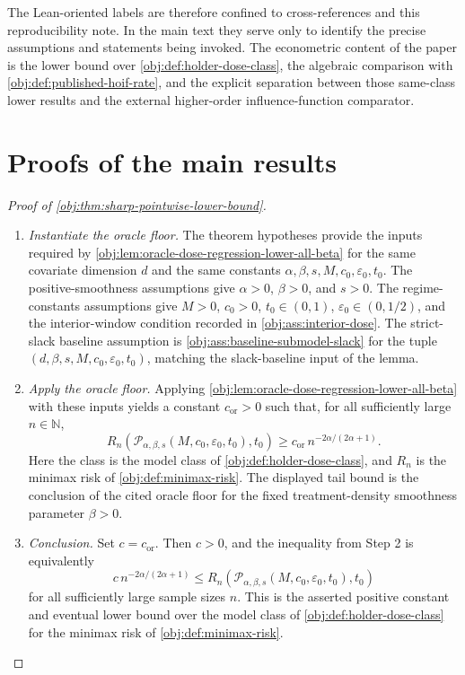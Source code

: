 \documentclass[11pt]{article}
\begin{document}
The Lean-oriented labels are therefore confined to cross-references and this reproducibility note. In the main text they serve only to identify the precise assumptions and statements being invoked. The econometric content of the paper is the lower bound over \cref{obj:def:holder-dose-class}, the algebraic comparison with \cref{obj:def:published-hoif-rate}, and the explicit separation between those same-class lower results and the external higher-order influence-function comparator.


\section{Proofs of the main results}\label{sec:deferred-proofs}

\begin{proof}[Proof of \cref{obj:thm:sharp-pointwise-lower-bound}]
\begin{enumerate}
\item \emph{Instantiate the oracle floor.} The theorem hypotheses provide the inputs required by \cref{obj:lem:oracle-dose-regression-lower-all-beta} for the same covariate dimension \(d\) and the same constants \(\alpha,\beta,s,M,c_0,\varepsilon_0,t_0\). The positive-smoothness assumptions give \(\alpha>0\), \(\beta>0\), and \(s>0\). The regime-constants assumptions give \(M>0\), \(c_0>0\), \(t_0\in(0,1)\), \(\varepsilon_0\in(0,1/2)\), and the interior-window condition recorded in \cref{obj:ass:interior-dose}. The strict-slack baseline assumption is \cref{obj:ass:baseline-submodel-slack} for the tuple \((d,\beta,s,M,c_0,\varepsilon_0,t_0)\), matching the slack-baseline input of the lemma.

\item \emph{Apply the oracle floor.} Applying \cref{obj:lem:oracle-dose-regression-lower-all-beta} with these inputs yields a constant \(c_{\mathrm{or}}>0\) such that, for all sufficiently large \(n\in\mathbb N\),
\[
R_n\!\left(
    \mathcal P_{\alpha,\beta,s}(M,c_0,\varepsilon_0,t_0),
    t_0
  \right)
\ge
c_{\mathrm{or}}\,n^{-2\alpha/(2\alpha+1)} .
\]
Here the class is the model class of \cref{obj:def:holder-dose-class}, and \(R_n\) is the minimax risk of \cref{obj:def:minimax-risk}. The displayed tail bound is the conclusion of the cited oracle floor for the fixed treatment-density smoothness parameter \(\beta>0\).

\item \emph{Conclusion.} Set \(c=c_{\mathrm{or}}\). Then \(c>0\), and the inequality from Step 2 is equivalently
\[
  c\, n^{-2\alpha/(2\alpha+1)}
  \le
  R_n\!\left(
    \mathcal P_{\alpha,\beta,s}(M,c_0,\varepsilon_0,t_0),
    t_0
  \right)
\]
for all sufficiently large sample sizes \(n\). This is the asserted positive constant and eventual lower bound over the model class of \cref{obj:def:holder-dose-class} for the minimax risk of \cref{obj:def:minimax-risk}.
\end{enumerate}
\end{proof}
\end{document}
